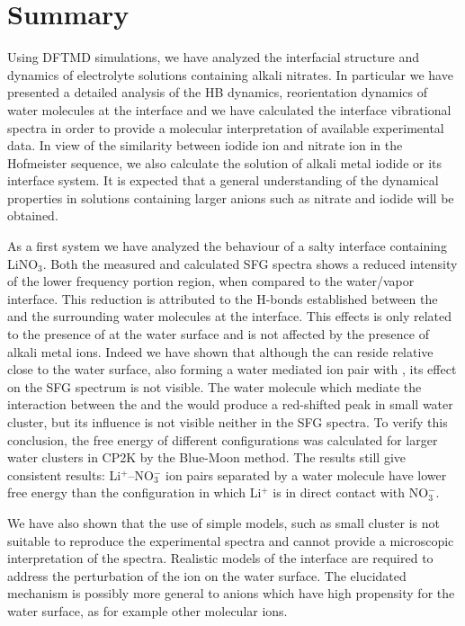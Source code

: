 \chapter{Summary}\label{CHAPTER_Summary}
Using DFTMD simulations, we have analyzed the interfacial structure and dynamics of electrolyte solutions containing alkali nitrates.
In particular we have presented a detailed analysis of the HB dynamics, reorientation dynamics of water molecules at the interface 
and we have calculated the interface vibrational spectra in order to provide a molecular interpretation of available experimental data. 
In view of the similarity between iodide ion and nitrate ion in the Hofmeister sequence, we also calculate the solution of alkali metal iodide
or its interface system. It is expected that a general understanding of the dynamical properties in solutions containing larger anions such as 
nitrate and iodide will be obtained.

As a first system we have analyzed the behaviour of a salty interface containing LiNO$_3$.
Both the measured and calculated SFG spectra shows a reduced intensity of the lower frequency portion region, 
when compared to the water/vapor interface. 
This reduction is attributed to the H-bonds established between the \nitrate and the surrounding water molecules at the interface.
This effects is only related to the presence of \nitrate at the water surface and is not affected by the presence of alkali metal ions.
Indeed we have shown that although the \Li can reside relative close to the water surface, also forming a water mediated
ion pair with \nit, its effect on the SFG spectrum is not visible. The water molecule which mediate the interaction 
between the \nitrate and the \Li would produce a red-shifted peak in small water cluster, but its influence is not visible 
neither in the SFG spectra. To verify this conclusion, the free energy of different configurations was calculated for 
larger water clusters in CP2K by the Blue-Moon method. The results still give consistent results: Li$^+$--NO$_3^-$ ion pairs 
separated by a water molecule have lower free energy than the configuration in which Li$^+$ is in direct contact with NO$_3^-$. 

We have also shown that the use of simple models, such as small cluster is not suitable to reproduce the experimental spectra 
and cannot provide a microscopic interpretation of the spectra. Realistic models of the interface are required to address the 
perturbation of the ion on the water surface. The elucidated mechanism is possibly more general to anions which have high 
propensity for the water surface, as for example other molecular ions.


